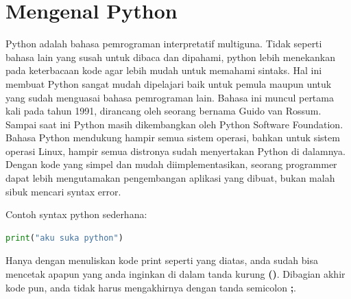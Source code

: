 \section{Mengenal Python}
Python adalah bahasa pemrograman interpretatif multiguna. Tidak seperti bahasa lain yang susah untuk dibaca dan dipahami, python lebih menekankan pada keterbacaan kode agar lebih mudah untuk memahami sintaks. Hal ini membuat Python sangat mudah dipelajari baik untuk pemula maupun untuk yang sudah menguasai bahasa pemrograman lain. Bahasa ini muncul pertama kali pada tahun 1991, dirancang oleh seorang bernama Guido van Rossum. Sampai saat ini Python masih dikembangkan oleh Python Software Foundation. Bahasa Python mendukung hampir semua sistem operasi, bahkan untuk sistem operasi Linux, hampir semua distronya sudah menyertakan Python di dalamnya. Dengan kode yang simpel dan mudah diimplementasikan, seorang programmer dapat lebih mengutamakan pengembangan aplikasi yang dibuat, bukan malah sibuk mencari syntax error.

Contoh syntax python sederhana:
\begin{lstlisting}[language=Python]
print("aku suka python")
\end{lstlisting}

Hanya dengan menuliskan kode print seperti yang diatas, anda sudah bisa mencetak apapun yang anda inginkan di dalam tanda kurung \textbf{()}. Dibagian akhir kode pun, anda tidak harus mengakhirnya dengan tanda semicolon \textbf{;}.

